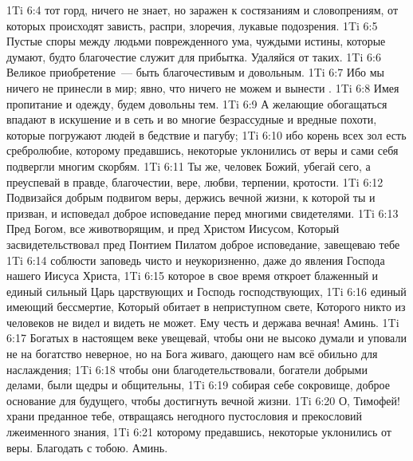 \vs 1Ti 6:4 тот горд, ничего не знает, но заражен  к состязаниям и словопрениям, от которых происходят зависть, распри, злоречия, лукавые подозрения.
\vs 1Ti 6:5 Пустые споры между людьми поврежденного ума, чуждыми истины, которые думают, будто благочестие служит для прибытка. Удаляйся от таких.
\rsbpar\vs 1Ti 6:6 Великое приобретение~--- быть благочестивым и довольным.
\vs 1Ti 6:7 Ибо мы ничего не принесли в мир; явно, что ничего не можем и вынести .
\vs 1Ti 6:8 Имея пропитание и одежду, будем довольны тем.
\vs 1Ti 6:9 А желающие обогащаться впадают в искушение и в сеть и во многие безрассудные и вредные похоти, которые погружают людей в бедствие и пагубу;
\vs 1Ti 6:10 ибо корень всех зол есть сребролюбие, которому предавшись, некоторые уклонились от веры и сами себя подвергли многим скорбям.
\vs 1Ti 6:11 Ты же, человек Божий, убегай сего, а преуспевай в правде, благочестии, вере, любви, терпении, кротости.
\vs 1Ti 6:12 Подвизайся добрым подвигом веры, держись вечной жизни, к которой ты и призван, и исповедал доброе исповедание перед многими свидетелями.
\vs 1Ti 6:13 Пред Богом, все животворящим, и пред Христом Иисусом, Который засвидетельствовал пред Понтием Пилатом доброе исповедание, завещеваю тебе
\vs 1Ti 6:14 соблюсти заповедь чисто и неукоризненно, даже до явления Господа нашего Иисуса Христа,
\vs 1Ti 6:15 которое в свое время откроет блаженный и единый сильный Царь царствующих и Господь господствующих,
\vs 1Ti 6:16 единый имеющий бессмертие, Который обитает в неприступном свете, Которого никто из человеков не видел и видеть не может. Ему честь и держава вечная! Аминь.
\rsbpar\vs 1Ti 6:17 Богатых в настоящем веке увещевай, чтобы они не высоко думали  и уповали не на богатство неверное, но на Бога живаго, дающего нам всё обильно для наслаждения;
\vs 1Ti 6:18 чтобы они благодетельствовали, богатели добрыми делами, были щедры и общительны,
\vs 1Ti 6:19 собирая себе сокровище, доброе основание для будущего, чтобы достигнуть вечной жизни.
\rsbpar\vs 1Ti 6:20 О, Тимофей! храни преданное тебе, отвращаясь негодного пустословия и прекословий лжеименного знания,
\vs 1Ti 6:21 которому предавшись, некоторые уклонились от веры. Благодать с тобою. Аминь.
